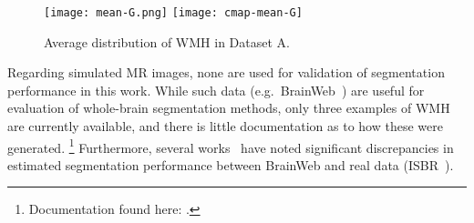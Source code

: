 \begin{figure}
  \centering
  \texttt{[image: mean-G.png]}
  \texttt{[image: cmap-mean-G]}
  \caption{Average distribution of WMH in Dataset A.}%
  \label{fig:mean-wmh}
\end{figure}
Regarding simulated MR images,
none are used for validation of segmentation performance in this work.
While such data (e.g.\ BrainWeb~\cite{Collins1998})
are useful for evaluation of whole-brain segmentation methods,
only three examples of WMH are currently available,
and there is little documentation as to how these were generated.%
\footnote{Documentation found here:
  .}
Furthermore, several works~\cite{Klauschen2009,Eggert2012} have noted significant discrepancies
in estimated segmentation performance between BrainWeb and real data (ISBR~\cite{IBSR}).
